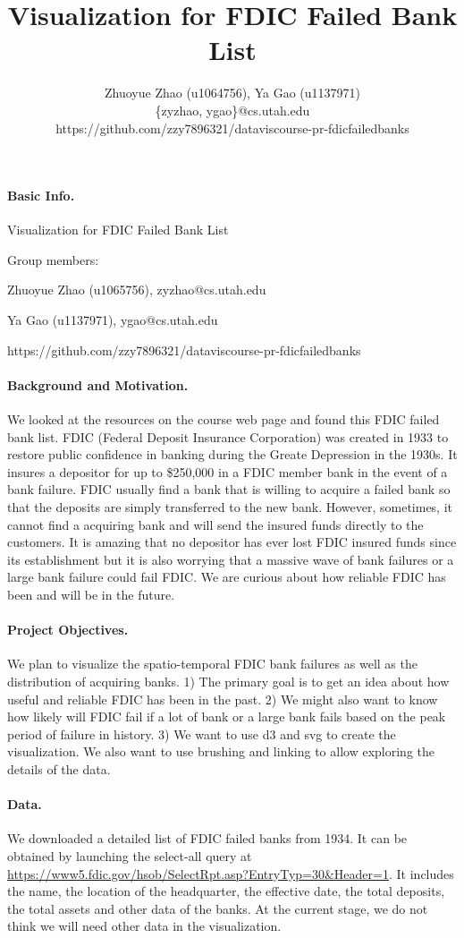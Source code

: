 \documentclass[11pt]{article}
\title{Visualization for FDIC Failed Bank List}
\author{Zhuoyue Zhao (u1064756), Ya Gao (u1137971)\\\{zyzhao, ygao\}@cs.utah.edu
\\https://github.com/zzy7896321/dataviscourse-pr-fdicfailedbanks}
\date{}
\begin{document}
\paragraph{Basic Info.} Visualization for FDIC Failed Bank List

Group members:

Zhuoyue Zhao (u1065756), zyzhao@cs.utah.edu

Ya Gao (u1137971), ygao@cs.utah.edu

https://github.com/zzy7896321/dataviscourse-pr-fdicfailedbanks


\paragraph{Background and Motivation.}

We looked at the resources on the course web page and found this FDIC failed
bank list. FDIC (Federal Deposit Insurance Corporation) was created in 1933
to restore public confidence in banking during the Greate Depression in the
1930s.  It insures a depositor for up to \$250,000 in a FDIC member bank in
the event of a bank failure. FDIC usually find a bank that is willing to
acquire a failed bank so that the deposits are simply transferred to the new
bank. However, sometimes, it cannot find a acquiring bank and will send the
insured funds directly to the customers. It is amazing that no depositor has
ever lost FDIC insured funds since its establishment but it is also worrying
that a massive wave of bank failures or a large bank failure could fail FDIC.
We are curious about how reliable FDIC has been and will be in the future.

\paragraph{Project Objectives.} 
We plan to visualize the spatio-temporal FDIC bank failures as well as the
distribution of acquiring banks. 1) The primary goal is to get an idea about
how useful and reliable FDIC has been in the past. 2) We might also want to
know how likely will FDIC fail if a lot of bank or a large bank fails based on
the peak period of failure in history. 3) We want to use d3 and svg to create
the visualization. We also want to use brushing and linking to allow exploring
the details of the data.

\paragraph{Data.}
We downloaded a detailed list of FDIC failed banks from 1934. It can be
obtained by launching the select-all query at
\url{https://www5.fdic.gov/hsob/SelectRpt.asp?EntryTyp=30&Header=1}. It
includes the name, the location of the headquarter, the effective date, the
total deposits, the total assets and other data of the banks. At the current
stage, we do not think we will need other data in the visualization.
\end{document}
